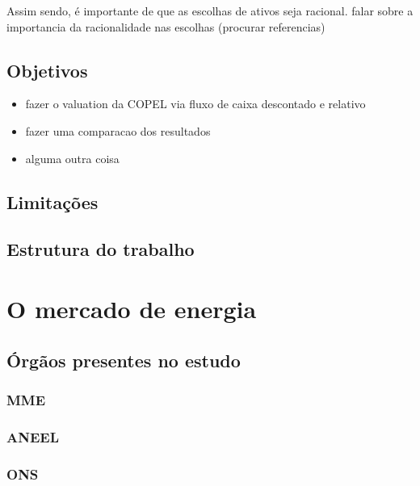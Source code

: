 \documentclass[grad,numbers]{coppe}
\providecommand{\tightlist}{%
  \setlength{\itemsep}{0pt}\setlength{\parskip}{0pt}}
\begin{document}
  Assim sendo, é importante de que as escolhas de ativos seja racional.
  falar sobre a importancia da racionalidade nas escolhas (procurar referencias)
  
  \hypertarget{objetivos}{%
  \section{Objetivos}\label{objetivos}}
  \begin{itemize}
  \tightlist
  \item
    fazer o valuation da COPEL via fluxo de caixa descontado e relativo
  \item
    fazer uma comparacao dos resultados
  \item
    alguma outra coisa
  \end{itemize}
  \hypertarget{limitauxe7uxf5es}{%
  \section{Limitações}\label{limitauxe7uxf5es}}
  
  \hypertarget{estrutura-do-trabalho}{%
  \section{Estrutura do trabalho}\label{estrutura-do-trabalho}}
  
  \hypertarget{o-mercado-de-energia}{%
  \chapter{O mercado de energia}\label{o-mercado-de-energia}}
  
  \hypertarget{uxf3rguxe3os-presentes-no-estudo}{%
  \section{Órgãos presentes no estudo}\label{uxf3rguxe3os-presentes-no-estudo}}
  
  \hypertarget{mme}{%
  \subsection{MME}\label{mme}}
  
  \hypertarget{aneel}{%
  \subsection{ANEEL}\label{aneel}}
  
  \hypertarget{ons}{%
  \subsection{ONS}\label{ons}}
  
\end{document}

